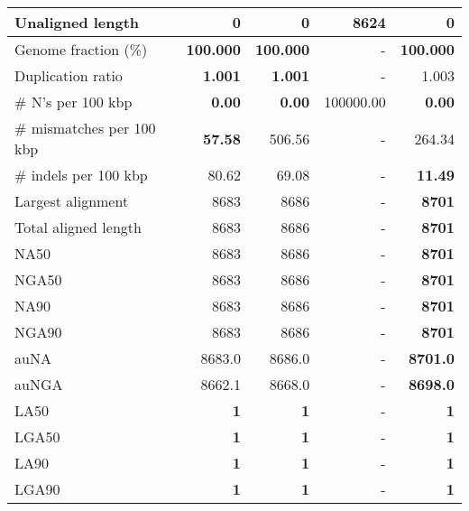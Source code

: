 \documentclass[12pt,a4paper]{article}
\begin{document}
\begin{table}[ht]
\begin{center}
\begin{tabular}{|l*{4}{|r}|}
Unaligned length & {\bf 0} & {\bf 0} & 8624 & {\bf 0} \\ \hline
Genome fraction (\%) & {\bf 100.000} & {\bf 100.000} & - & {\bf 100.000} \\ \hline
Duplication ratio & {\bf 1.001} & {\bf 1.001} & - & 1.003 \\ \hline
\# N's per 100 kbp & {\bf 0.00} & {\bf 0.00} & 100000.00 & {\bf 0.00} \\ \hline
\# mismatches per 100 kbp & {\bf 57.58} & 506.56 & - & 264.34 \\ \hline
\# indels per 100 kbp & 80.62 & 69.08 & - & {\bf 11.49} \\ \hline
Largest alignment & 8683 & 8686 & - & {\bf 8701} \\ \hline
Total aligned length & 8683 & 8686 & - & {\bf 8701} \\ \hline
NA50 & 8683 & 8686 & - & {\bf 8701} \\ \hline
NGA50 & 8683 & 8686 & - & {\bf 8701} \\ \hline
NA90 & 8683 & 8686 & - & {\bf 8701} \\ \hline
NGA90 & 8683 & 8686 & - & {\bf 8701} \\ \hline
auNA & 8683.0 & 8686.0 & - & {\bf 8701.0} \\ \hline
auNGA & 8662.1 & 8668.0 & - & {\bf 8698.0} \\ \hline
LA50 & {\bf 1} & {\bf 1} & - & {\bf 1} \\ \hline
LGA50 & {\bf 1} & {\bf 1} & - & {\bf 1} \\ \hline
LA90 & {\bf 1} & {\bf 1} & - & {\bf 1} \\ \hline
LGA90 & {\bf 1} & {\bf 1} & - & {\bf 1} \\ \hline
\end{tabular}
\end{center}
\end{table}
\end{document}
